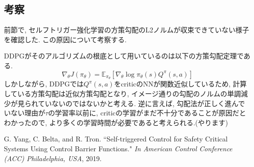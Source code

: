 \documentclass{jsarticle}
\newcommand{\expect}{\mathbb{E}}
\begin{document}
\subsection{考察}
前節で, セルフトリガー強化学習の方策勾配のL2ノルムが収束できていない様子を確認した. この原因について考察する.\par
DDPGがそのアルゴリズムの根底として用いているのは以下の方策勾配定理である.
\begin{equation}
	\nabla_{\theta}J(\pi_{\theta}) = \expect_{\pi_{\theta}}[\nabla_{\theta}\log\pi_{\theta}(s)Q^{\pi}(s,a)]
\end{equation}
しかしながら, DDPGでは$Q^{\pi}(s,a)$をcriticのNNが関数近似しているため, 計算している方策勾配は近似方策勾配となり, イメージ通りの勾配のノルムの単調減少が見られていないのではないかと考える. 逆に言えば, 勾配法が正しく進んでいない理由が$\tau$の学習率以前に, criticの学習がまだ不十分であることが原因だとわかったので, より多くの学習時間が必要であると考えられる.(やります)


\begin{thebibliography}{10}
G. Yang, C. Belta, and R. Tron. “Self-triggered Control for Safety Critical Systems Using Control Barrier Functions."  \textit{In American Control Conference (ACC) Philadelphia, USA}, 2019.
 
 \end{thebibliography}
\end{document}
